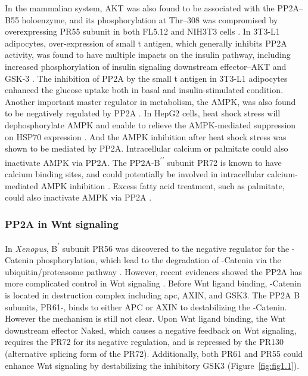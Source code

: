 In the mammalian system, AKT was also found to be associated with the PP2A--B55 holoenzyme, and its phosphorylation at Thr--308 was compromised by overexpressing PR55\textalpha{} subunit in both FL5.12 and NIH3T3 cells \cite{kuo_regulation_2008}. In 3T3-L1 adipocytes, over-expression of small t antigen, which generally inhibits PP2A activity, was found to have multiple impacts on the insulin pathway, including increased phosphorylation of insulin signaling downstream effector--AKT and GSK-3\textbeta{} \cite{ugi_protein_2004}. The inhibition of PP2A by the small t antigen in 3T3-L1 adipocytes enhanced the glucose uptake both in basal and insulin-stimulated condition. Another important master regulator in metabolism, the AMPK, was also found to be negatively regulated by PP2A \cite{wu_activation_2007,park_ampk_2013,wang_pp2a_2010}. In HepG2 cells, heat shock stress will dephosphorylate AMPK and enable to relieve the AMPK-mediated suppression on HSP70 expression \cite{wang_pp2a_2010}. And the AMPK inhibition after heat shock stress was shown to be mediated by PP2A. Intracellular calcium or palmitate could also inactivate AMPK via PP2A. The PP2A-B\textsuperscript{$\prime\prime$} subunit PR72 is known to have calcium binding sites, and could potentially be involved in intracellular calcium-mediated AMPK inhibition \cite{park_ampk_2013}. Excess fatty acid treatment, such as palmitate, could also inactivate AMPK via PP2A \cite{wu_activation_2007}.   

\subsubsection{PP2A in Wnt signaling}

In \textit{Xenopus}, B\textsuperscript{$\prime$} subunit PR56\textalpha{} was discovered to the negative regulator for the \textbeta-Catenin phosphorylation, which lead to the degradation of \textbeta-Catenin via the ubiquitin/proteasome pathway \cite{li_protein_2001}. However, recent evidences showed the PP2A has more complicated control in Wnt signaling \cite{eichhorn_protein_2009}. Before Wnt ligand binding, \textbeta-Catenin is located in destruction complex including \gls{apc}, AXIN, and GSK3\textbeta{}. The PP2A B subunits, PR61\textalpha{}-\textdelta{}, binds to either APC or AXIN to destabilizing the \textbeta-Catenin. However the mechanism is still not clear. Upon Wnt ligand binding, the Wnt downstream effector Naked, which causes a negative feedback on Wnt signaling, requires the PR72 for its negative regulation, and is repressed by the PR130 (alternative splicing form of the PR72). Additionally, both PR61\textepsilon{} and PR55 could enhance Wnt signaling by destabilizing the inhibitory GSK3\textbeta{} (Figure~\ref{fig:fig1.1}). 

